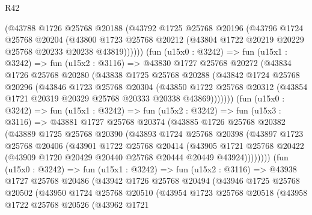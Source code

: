 \begin{lexlean}{R42}
\begin{coremodule}
          (@43788
            @1726
            @25768
            @20188
            (@43792
              @1725
              @25768
              @20196
              (@43796
                @1724
                @25768
                @20204
                (@43800
                  @1723
                  @25768
                  @20212
                  (@43804 @1722 @20219 @20229 @25768 @20233 @20238 @43819))))))
        (fun (u15x0 : @3242) =>
        fun (u15x1 : @3242) =>
        fun (u15x2 : @3116) =>
        @43830
          @1727
          @25768
          @20272
          (@43834
            @1726
            @25768
            @20280
            (@43838
              @1725
              @25768
              @20288
              (@43842
                @1724
                @25768
                @20296
                (@43846
                  @1723
                  @25768
                  @20304
                  (@43850
                    @1722
                    @25768
                    @20312
                    (@43854 @1721 @20319 @20329 @25768 @20333 @20338 @43869)))))))
        (fun (u15x0 : @3242) =>
        fun (u15x1 : @3242) =>
        fun (u15x2 : @3242) =>
        fun (u15x3 : @3116) =>
        @43881
          @1727
          @25768
          @20374
          (@43885
            @1726
            @25768
            @20382
            (@43889
              @1725
              @25768
              @20390
              (@43893
                @1724
                @25768
                @20398
                (@43897
                  @1723
                  @25768
                  @20406
                  (@43901
                    @1722
                    @25768
                    @20414
                    (@43905
                      @1721
                      @25768
                      @20422
                      (@43909 @1720 @20429 @20440 @25768 @20444 @20449 @43924))))))))
        (fun (u15x0 : @3242) =>
        fun (u15x1 : @3242) =>
        fun (u15x2 : @3116) =>
        @43938
          @1727
          @25768
          @20486
          (@43942
            @1726
            @25768
            @20494
            (@43946
              @1725
              @25768
              @20502
              (@43950
                @1724
                @25768
                @20510
                (@43954
                  @1723
                  @25768
                  @20518
                  (@43958
                    @1722
                    @25768
                    @20526
                    (@43962
                      @1721

\end{coremodule}
\end{lexlean}
